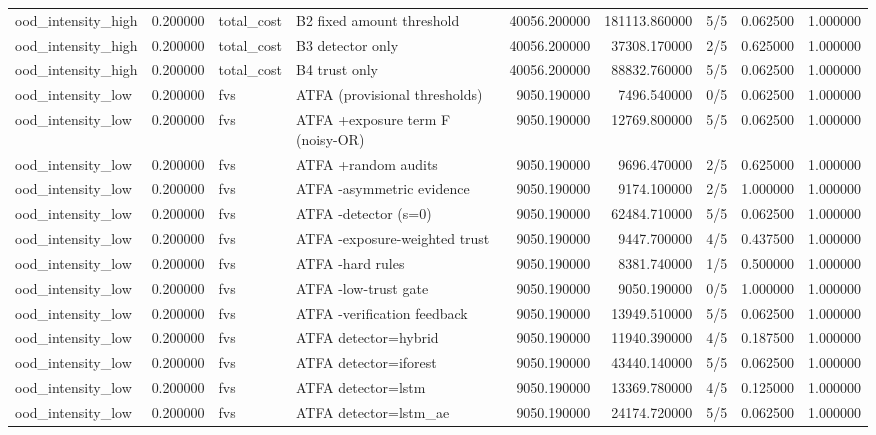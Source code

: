 \begin{tabular}{lrllrrlrr}
ood\_intensity\_high & 0.200000 & total\_cost & B2 fixed amount threshold & 40056.200000 & 181113.860000 & 5/5 & 0.062500 & 1.000000 \\
ood\_intensity\_high & 0.200000 & total\_cost & B3 detector only & 40056.200000 & 37308.170000 & 2/5 & 0.625000 & 1.000000 \\
ood\_intensity\_high & 0.200000 & total\_cost & B4 trust only & 40056.200000 & 88832.760000 & 5/5 & 0.062500 & 1.000000 \\
ood\_intensity\_low & 0.200000 & fvs & ATFA (provisional thresholds) & 9050.190000 & 7496.540000 & 0/5 & 0.062500 & 1.000000 \\
ood\_intensity\_low & 0.200000 & fvs & ATFA +exposure term F (noisy-OR) & 9050.190000 & 12769.800000 & 5/5 & 0.062500 & 1.000000 \\
ood\_intensity\_low & 0.200000 & fvs & ATFA +random audits & 9050.190000 & 9696.470000 & 2/5 & 0.625000 & 1.000000 \\
ood\_intensity\_low & 0.200000 & fvs & ATFA -asymmetric evidence & 9050.190000 & 9174.100000 & 2/5 & 1.000000 & 1.000000 \\
ood\_intensity\_low & 0.200000 & fvs & ATFA -detector (s=0) & 9050.190000 & 62484.710000 & 5/5 & 0.062500 & 1.000000 \\
ood\_intensity\_low & 0.200000 & fvs & ATFA -exposure-weighted trust & 9050.190000 & 9447.700000 & 4/5 & 0.437500 & 1.000000 \\
ood\_intensity\_low & 0.200000 & fvs & ATFA -hard rules & 9050.190000 & 8381.740000 & 1/5 & 0.500000 & 1.000000 \\
ood\_intensity\_low & 0.200000 & fvs & ATFA -low-trust gate & 9050.190000 & 9050.190000 & 0/5 & 1.000000 & 1.000000 \\
ood\_intensity\_low & 0.200000 & fvs & ATFA -verification feedback & 9050.190000 & 13949.510000 & 5/5 & 0.062500 & 1.000000 \\
ood\_intensity\_low & 0.200000 & fvs & ATFA detector=hybrid & 9050.190000 & 11940.390000 & 4/5 & 0.187500 & 1.000000 \\
ood\_intensity\_low & 0.200000 & fvs & ATFA detector=iforest & 9050.190000 & 43440.140000 & 5/5 & 0.062500 & 1.000000 \\
ood\_intensity\_low & 0.200000 & fvs & ATFA detector=lstm & 9050.190000 & 13369.780000 & 4/5 & 0.125000 & 1.000000 \\
ood\_intensity\_low & 0.200000 & fvs & ATFA detector=lstm\_ae & 9050.190000 & 24174.720000 & 5/5 & 0.062500 & 1.000000 \\

\end{tabular}
